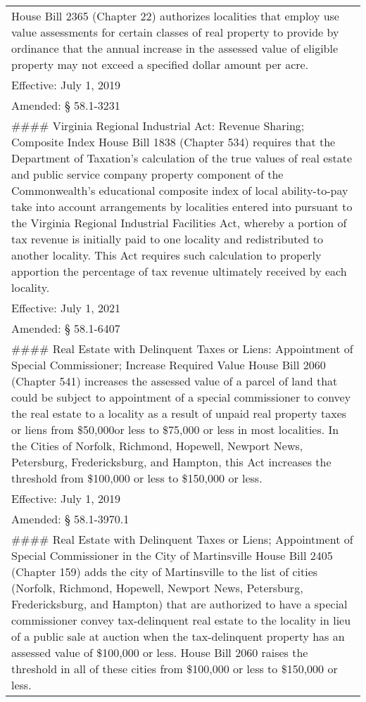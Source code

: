 \documentclass[
]{book}
\begin{document}
\begin{longtable}[]{@{}
  >{\raggedright\arraybackslash}p{}@{}}
House Bill 2365 (Chapter 22) authorizes localities that employ use value assessments for certain classes of real property to provide by ordinance that the annual increase in the assessed value of eligible property may not exceed a specified dollar amount per acre. \\
Effective: July 1, 2019 \\
Amended: § 58.1-3231 \\
\#\#\#\# Virginia Regional Industrial Act: Revenue Sharing; Composite Index
House Bill 1838 (Chapter 534) requires that the Department of Taxation's calculation of the true values of real estate and public service company property component of the Commonwealth's educational composite index of local ability-to-pay take into account arrangements by localities entered into pursuant to the Virginia Regional Industrial Facilities Act, whereby a portion of tax revenue is initially paid to one locality and redistributed to another locality. This Act requires such calculation to properly apportion the percentage of tax revenue ultimately received by each locality. \\
Effective: July 1, 2021 \\
Amended: § 58.1-6407 \\
\#\#\#\# Real Estate with Delinquent Taxes or Liens: Appointment of Special Commissioner; Increase Required Value
House Bill 2060 (Chapter 541) increases the assessed value of a parcel of land that could be subject to appointment of a special commissioner to convey the real estate to a locality as a result of unpaid real property taxes or liens from \$50,000or less to \$75,000 or less in most localities. In the Cities of Norfolk, Richmond, Hopewell, Newport News, Petersburg, Fredericksburg, and Hampton, this Act increases the threshold from \$100,000 or less to \$150,000 or less. \\
Effective: July 1, 2019 \\
Amended: § 58.1-3970.1 \\
\#\#\#\# Real Estate with Delinquent Taxes or Liens; Appointment of Special Commissioner in the City of Martinsville
House Bill 2405 (Chapter 159) adds the city of Martinsville to the list of cities (Norfolk, Richmond, Hopewell, Newport News, Petersburg, Fredericksburg, and Hampton) that are authorized to have a special commissioner convey tax-delinquent real estate to the locality in lieu of a public sale at auction when the tax-delinquent property has an assessed value of \$100,000 or less. House Bill 2060 raises the threshold in all of these cities from \$100,000 or less to \$150,000 or less. \\

\end{longtable}
\end{document}
